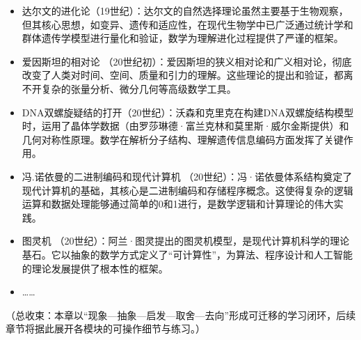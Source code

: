 \begin{itemize}
\item 达尔文的进化论（19世纪）：达尔文的自然选择理论虽然主要基于生物观察，但其核心思想，如变异、遗传和适应性，在现代生物学中已广泛通过统计学和群体遗传学模型进行量化和验证，数学为理解进化过程提供了严谨的框架。
\item 爱因斯坦的相对论 （20世纪初）：爱因斯坦的狭义相对论和广义相对论，彻底改变了人类对时间、空间、质量和引力的理解。这些理论的提出和验证，都离不开复杂的张量分析、微分几何等高级数学工具。
\item DNA双螺旋疑结的打开（20世纪）：沃森和克里克在构建DNA双螺旋结构模型时，运用了晶体学数据（由罗莎琳德·富兰克林和莫里斯·威尔金斯提供）和几何对称性原理。数学在解析分子结构、理解遗传信息编码方面发挥了关键作用。
\item 冯.诺依曼的二进制编码和现代计算机 （20世纪）：冯·诺依曼体系结构奠定了现代计算机的基础，其核心是二进制编码和存储程序概念。这使得复杂的逻辑运算和数据处理能够通过简单的0和1进行，是数学逻辑和计算理论的伟大实践。
\item 图灵机 （20世纪）：阿兰·图灵提出的图灵机模型，是现代计算机科学的理论基石。它以抽象的数学方式定义了“可计算性”，为算法、程序设计和人工智能的理论发展提供了根本性的框架。
\item ……
\end{itemize}
{（总收束：本章以“现象—抽象—启发—取舍—去向”形成可迁移的学习闭环，后续章节将据此展开各模块的可操作细节与练习。）}
